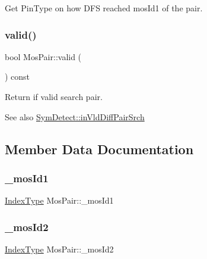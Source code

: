 Get Pin\+Type on how D\+FS reached mos\+Id1 of the pair. 

\mbox{\label{classMosPair_a16696e5a4fa38118f88549dfc782ac22}} 
\subsubsection{\texorpdfstring{valid()}{valid()}}
{\footnotesize\ttfamily bool Mos\+Pair\+::valid (\begin{DoxyParamCaption}{ }\end{DoxyParamCaption}) const\hspace{0.3cm}{\ttfamily [inline]}}



Return if valid search pair. 

\begin{DoxySeeAlso}{See also}
\hyperlink{classSymDetect_ae6a1ba27f6768f215cba0623b6e2ce08}{Sym\+Detect\+::in\+Vld\+Diff\+Pair\+Srch} 
\end{DoxySeeAlso}


\subsection{Member Data Documentation}
\mbox{\label{classMosPair_a783f254c414a4b746eadbb9d2e49281b}} 
\subsubsection{\texorpdfstring{\+\_\+mos\+Id1}{\_mosId1}}
{\footnotesize\ttfamily \hyperlink{type_8h_a581e8093e28e7362f2b6937296190676}{Index\+Type} Mos\+Pair\+::\+\_\+mos\+Id1\hspace{0.3cm}{\ttfamily [private]}}

\mbox{\label{classMosPair_a4d44569f1b7537fddae9f4c89d5c0f96}} 
\subsubsection{\texorpdfstring{\+\_\+mos\+Id2}{\_mosId2}}
{\footnotesize\ttfamily \hyperlink{type_8h_a581e8093e28e7362f2b6937296190676}{Index\+Type} Mos\+Pair\+::\+\_\+mos\+Id2\hspace{0.3cm}{\ttfamily [private]}}

